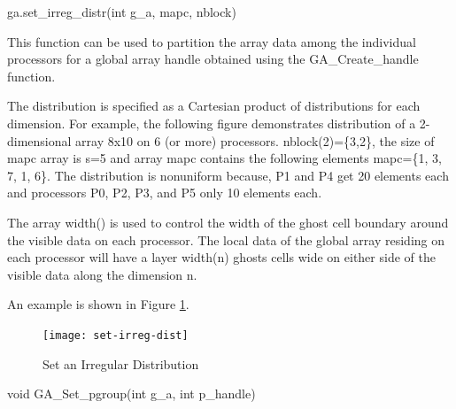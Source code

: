 \documentclass[10pt]{article}
\begin{document}
\begin{pyapi}
\begin{pycode}
ga.set_irreg_distr(int g_a, mapc, nblock)
\end{pycode}
\begin{funcargs}
\end{funcargs}
\end{pyapi}

\gcoll

\begin{desc}

This function can be used to partition the array data among the individual
processors for a global array handle obtained using the GA_Create_handle
function.

The distribution is specified as a Cartesian product of distributions for each
dimension. For example, the following figure demonstrates distribution of a
2-dimensional array 8x10 on 6 (or more) processors. nblock(2)=\{3,2\}, the size
of mapc array is s=5 and array mapc contains the following elements mapc=\{1,
3, 7, 1, 6\}. The distribution is nonuniform because, P1 and P4 get 20 elements
each and processors P0, P2, P3, and P5 only 10 elements each.

The array width() is used to control the width of the ghost cell boundary
around the visible data on each processor. The local data of the global array
residing on each processor will have a layer width(n) ghosts cells wide on
either side of the visible data along the dimension n.

An example is shown in Figure \ref{setirregdist}.

\begin{figure}
\centering
\texttt{[image: set-irreg-dist]}
\caption{Set an Irregular Distribution}
\label{setirregdist}
\end{figure}

\end{desc}


\begin{capi}
\begin{ccode}
void GA_Set_pgroup(int g_a, int p_handle)
\end{ccode}
\begin{funcargs}
\end{funcargs}
\end{capi}
\end{document}
